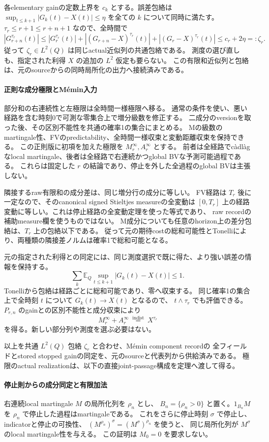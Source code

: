 各elementary gainの定数上界を $c_k$ とする。誤差包絡は
$\sup_{t\le k+1}|G_k(t)-X(t)|\le\eta$ を全ての $k$ について同時に満たす。
$\tau_r\le r+1\le r+n+1$ なので、全時間で
\[
 |G_{r+n}^{\tau_r}(t)|
 \le |G_r^{\tau_r}(t)|
   +|(G_{r+n}-X)^{\tau_r}(t)|+|(G_r-X)^{\tau_r}(t)|
 \le c_r+2\eta=:\zeta_r .
\]
従って $\zeta_r\in L^2(Q)$ は同じactual近似列の共通包絡である。
測度の選び直しも、指定された利得 $X$ の追加の $L^2$ 仮定も要らない。
この有限和近似列と包絡は、元のsourceからの同時局所化の出力へ接続済みである。

\paragraph{正則な成分極限とM\'emin入力}
部分和の右連続性と左極限は全時間一様極限へ移る。
通常の条件を使い、悪い経路を含む時刻0で可測な零集合上で増分級数を修正する。
二成分のversionを取った後、その区別不能性を共通の確率1の集合にまとめる。
Mの級数のmartingale性、FVのpredictability、全時間一様収束と変動距離収束を保持できる。
この正則版に初項を加えた極限を $M_r^\infty,A_r^\infty$ とする。
前者は全経路でcàdlàgなlocal martingale、後者は全経路で右連続かつglobal BVな予測可能過程である。
これらは固定した $r$ の結論であり、停止を外した全過程のglobal BVは主張しない。

隣接するraw有限和の成分差は、同じ増分行の成分に等しい。
FV経路は $T_r$ 後に一定なので、そのcanonical signed Stieltjes measureの全変動は
$[0,T_r]$ 上の経路変動に等しい。これは停止経路の全変動定理を使った等式であり、
raw recordの補助measure欄を使うものではない。
M成分についても任意のhorizon上の差分包絡は、$T_r$ 上の包絡以下である。
従って元の期待costの総和可能性とTonelliにより、両種類の隣接差ノルムは確率1で総和可能となる。

元の指定された利得との同定には、同じ測度選択で既に得た、より強い誤差の情報を保持する。
\[
 \sum_k\mathbb E_Q\sup_{t\le k+1}|G_k(t)-X(t)|\le1.
\]
Tonelliから包絡は経路ごとに総和可能であり、零へ収束する。
同じ確率1の集合上で全時刻 $t$ について $G_k(t)\to X(t)$ となるので、
$t\wedge\tau_r$ でも評価できる。$P_{r,n}$ のgainとの区別不能性と成分収束により
\[
 M_r^\infty+A_r^\infty\ \overset{\mathrm{indist}}=\ X^{\tau_r}
\]
を得る。新しい部分列や測度を選ぶ必要はない。

以上を共通 $L^2(Q)$ 包絡 $\zeta_r$ と合わせ、M\'emin component recordの
全フィールドとstored stopped gainの同定を、元のsourceと代表列から供給済みである。
極限のactual realizationは、以下の直接joint-passage構成を定理へ渡して得る。


\paragraph{停止則からの成分同定と有限加法}
右連続local martingale $M$ の局所化列を $\rho_n$ とし、
$B_n=\{\rho_n>0\}$ と置く。$1_{B_n}M$ を $\rho_n$ で停止した過程はmartingaleである。
これをさらに停止時刻 $\sigma$ で停止し、indicatorと停止の可換性、
$(M^{\rho_n})^{\sigma}=(M^{\sigma})^{\rho_n}$ を使うと、
同じ局所化列が $M^{\sigma}$ のlocal martingale性を与える。
この証明は $M_0=0$ を要求しない。

